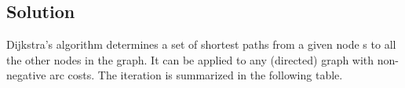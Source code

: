 \documentclass[12pt, a4paper]{report}
\newtheorem[style=M,bodystyle=\normalfont]{theorem}{Theorem}
\newtheorem[style=M,bodystyle=\normalfont]{corollary}{Corollary}
\newtheorem[style=M,bodystyle=\normalfont]{lemma}{Lemma}
\newtheorem[style=M,bodystyle=\normalfont]{definition}{Definition}
\begin{document}
    \subsection*{Solution}
        Dijkstra's algorithm determines a set of shortest paths from a given node s to all the other nodes in the graph. It can be applied to any (directed) graph with 
        non-negative arc costs. The iteration is summarized in the following table. 
        \begin{table}[H]
            \centering
\end{table}
\end{document}
